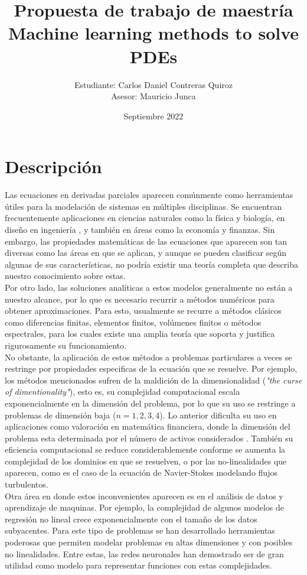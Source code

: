 \documentclass[a4paper,11pt]{scrartcl}
\title{Propuesta de trabajo de maestría\\
Machine learning methods to solve PDEs}
\author{Estudiante: Carlos Daniel Contreras Quiroz\\	
Asesor: Mauricio Junca}
\date{Septiembre 2022}
\begin{document}
	
	\maketitle
	
	
\section{Descripción}
Las ecuaciones en derivadas parciales aparecen comúnmente como herramientas útiles para la modelación de sistemas en múltiples disciplinas. Se encuentran frecuentemente aplicaciones en ciencias naturales como la física y biología, en diseño en ingeniería , y también en áreas como la economía y finanzas. Sin embargo, las propiedades matemáticas de las ecuaciones que aparecen son tan diversas como las áreas en que se aplican, y aunque se pueden clasificar según algunas de sus características, no podría existir una teoría completa que describa nuestro conocimiento sobre estas.\\

Por otro lado, las soluciones analíticas a estos modelos generalmente no están a nuestro alcance, por lo que es necesario recurrir a métodos numéricos para obtener aproximaciones. Para esto, usualmente se recurre a métodos clásicos como diferencias finitas, elementos finitos, volúmenes finitos o métodos espectrales, para los cuales existe una amplia teoría que soporta y justifica rigurosamente su funcionamiento.\\

No obstante, la aplicación de estos métodos a problemas particulares a veces se restringe por propiedades especificas de la ecuación que se resuelve. Por ejemplo, los métodos mencionados sufren de la maldición de la dimensionalidad (\textit{"the curse of dimentionality"}), esto es, su complejidad computacional escala exponencialmente en la dimensión del problema, por lo que su uso se restringe a problemas de dimensión baja ($n=1,2,3,4$). Lo anterior dificulta su uso en aplicaciones como valoración en matemática financiera, donde la dimensión del problema esta determinada por el número de activos considerados . También su eficiencia computacional se reduce considerablemente conforme se aumenta la complejidad de los dominios en que se resuelven, o por las no-linealidades que aparecen, como es el caso de la ecuación de Navier-Stokes modelando flujos turbulentos.\\

Otra área en donde estos inconvenientes aparecen es en el análisis de datos y aprendizaje de maquinas. Por ejemplo, la complejidad de algunos modelos de regresión no lineal crece exponencialmente con el tamaño de los datos subyacentes. Para este tipo de problemas se han desarrollado herramientas poderosas que permiten modelar problemas en altas dimensiones y con posibles no linealidades. Entre estas, las redes neuronales han demostrado ser de gran utilidad como modelo para representar funciones con estas complejidades.\\
\end{document}
